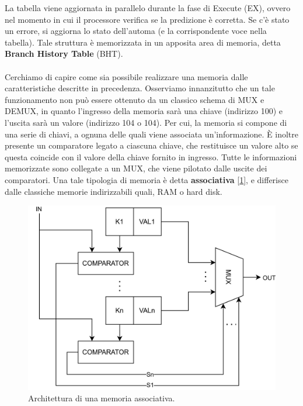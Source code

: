 La tabella viene aggiornata in parallelo durante la fase di Execute (EX), ovvero nel momento in cui il processore verifica se la predizione è corretta. Se c'è stato un errore, si aggiorna lo stato dell'automa (e la corrispondente voce nella tabella). Tale struttura è memorizzata in un apposita area di memoria, detta \textbf{Branch History Table} (BHT).
\\
\\
Cerchiamo di capire come sia possibile realizzare una memoria dalle caratteristiche descritte in precedenza. Osserviamo innanzitutto che un tale funzionamento non può essere ottenuto da un classico schema di MUX e DEMUX, in quanto l'ingresso della memoria sarà una chiave (indirizzo 100) e l'uscita sarà un valore (indirizzo 104 o 104). Per cui, la memoria si compone di una serie di chiavi, a ognuna delle quali viene associata un'informazione. \MakeUppercase{è} inoltre presente un comparatore legato a ciascuna chiave, che restituisce un valore alto se questa coincide con il valore della chiave fornito in ingresso. Tutte le informazioni memorizzate sono collegate a un MUX, che viene pilotato dalle uscite dei comparatori. Una tale tipologia di memoria è detta \textbf{associativa} [\ref{fig:mem_associativa}], e differisce dalle classiche memorie indirizzabili quali, RAM o hard disk.
\begin{figure}[!h]
    \centering
    \includegraphics[width=0.5\linewidth]{img/mem_associativa.png}
    \caption{Architettura di una memoria associativa.}
    \label{fig:mem_associativa}
\end{figure}


